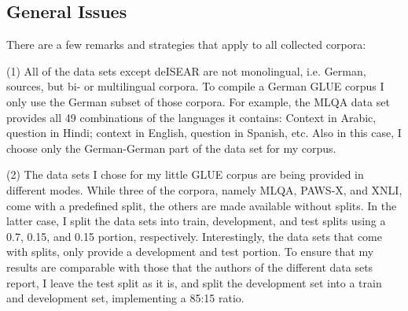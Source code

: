 
\subsection{General Issues}

There are a few remarks and strategies that apply to all collected corpora:

(1) All of the data sets except deISEAR are not monolingual, i.e. German, sources, but bi-
or multilingual corpora. To compile a German GLUE corpus I only use the German subset of
those corpora. For example, the MLQA data set provides all 49 combinations of the languages
it contains: Context in Arabic, question in Hindi; context in English, question in Spanish,
etc. Also in this case, I choose only the German-German part of the data set for my corpus.

(2) The data sets I chose for my little GLUE corpus are being provided in different modes.
While three of the corpora, namely MLQA, PAWS-X, and XNLI, come with a predefined split, the
others are made available without splits.
In the latter case, I split the data sets into train, development, and test splits using a 0.7,
0.15, and 0.15 portion, respectively.
Interestingly, the data sets that come with splits, only provide a development and test portion.
To ensure that my results are comparable with those that the authors of the different data sets
report, I leave the test split as it is, and split the development set into a train and
development set, implementing a 85:15 ratio.


